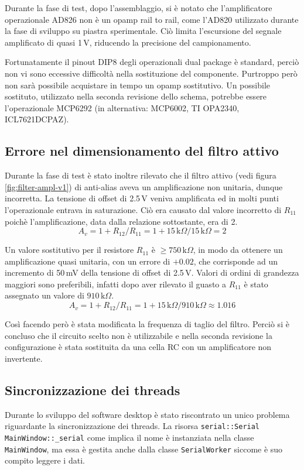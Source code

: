 Durante la fase di test, dopo l'assemblaggio, si \`e notato che
l'amplificatore operazionale AD826 non \`e un opamp rail to rail, come l'AD820
utilizzato durante la fase di sviluppo su piastra sperimentale.  Ci\`o limita
l'escursione del segnale amplificato di quasi 1\,V, riducendo la precisione
del campionamento.

Fortunatamente il pinout DIP8 degli operazionali dual package \`e standard,
perci\`o non vi sono eccessive difficolt\`a nella sostituzione del componente.
Purtroppo per\`o non sar\`a possibile acquistare in tempo un opamp
sostitutivo. Un possibile sostituto, utilizzato nella seconda revisione dello
schema, potrebbe essere l'operazionale MCP6292 (in alternativa: MCP6002, TI
OPA2340, ICL7621DCPAZ).

\subsection{Errore nel dimensionamento del filtro attivo}
\label{sec:err-filter}

Durante la fase di test \`e stato inoltre rilevato che il filtro attivo (vedi
figura \ref{fig:filter-ampl-v1}) di anti-alias aveva un amplificazione non
unitaria, dunque incorretta.  La tensione di offset di 2.5\,V veniva
amplificata ed in molti punti l'operazionale entrava in saturazione.  Ci\`o
era causato dal valore incorretto di \(R_{11}\) poich\`e l'amplificazione,
data dalla relazione sottostante, era  di 2.
\[
    A_v = 1+R_{12}/R_{11} = 1+15\,\text{k}\Omega/15\,\text{k}\Omega = 2
\]

Un valore sostitutivo per il resistore \(R_{11}\) \`e
\(\geq 750\,\text{k}\Omega\), in modo da ottenere un amplificazione quasi
unitaria, con un errore di \(+0.02\), che corrisponde ad un incremento di
50\,mV della tensione di offset di 2.5\,V. Valori di ordini di grandezza
maggiori sono preferibili, infatti dopo aver rilevato il guasto a \(R_{11}\)
\`e stato assegnato un valore di \(910\,\text{k}\Omega\).
\[
    A_v = 1+R_{12}/R_{11} = 1+15\,\text{k}\Omega/910\,\text{k}\Omega \approx 1.016
\]

Cos\`i facendo per\`o \`e stata modificata la frequenza di taglio del filtro.
Perci\`o si \`e concluso che il circuito scelto non \`e utilizzabile e nella
seconda revisione la configurazione \`e stata sostituita da una cella RC con
un amplificatore non invertente.

\subsection{Sincronizzazione dei threads}
\label{sec:err-sync}
Durante lo sviluppo del software desktop \`e stato riscontrato un unico
problema riguardante la sincronizzazione dei threads. La risorsa
\texttt{serial::Serial MainWindow::\_serial}  come implica il nome \`e
instanziata nella classe \texttt{MainWindow}, ma essa \`e gestita anche dalla
classe \texttt{SerialWorker} siccome \`e suo compito leggere i dati.

